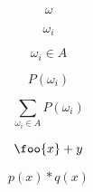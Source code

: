 \[
\omega
\]

\[
\omega_i
\]

\[
\omega_i\in A
\]

\[
P(\omega_i)
\]

\[
\sum_{\omega_i\in A}P(\omega_i)
\]

\[
\foo{x}+y
\]

\[
p(x) * q(x)
\]
